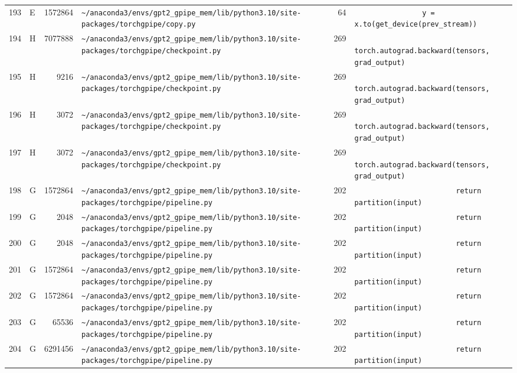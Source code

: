 \documentclass{article}
\begin{document}
\begin{longtable}{r l r p{6.5cm} r p{7.0cm}}
193 & E & 1572864 & \lstinline|~/anaconda3/envs/gpt2_gpipe_mem/lib/python3.10/site-packages/torchgpipe/copy.py| & 64 & \lstinline|                y = x.to(get_device(prev_stream))| \\
194 & H & 7077888 & \lstinline|~/anaconda3/envs/gpt2_gpipe_mem/lib/python3.10/site-packages/torchgpipe/checkpoint.py| & 269 & \lstinline|            torch.autograd.backward(tensors, grad_output)| \\
195 & H & 9216 & \lstinline|~/anaconda3/envs/gpt2_gpipe_mem/lib/python3.10/site-packages/torchgpipe/checkpoint.py| & 269 & \lstinline|            torch.autograd.backward(tensors, grad_output)| \\
196 & H & 3072 & \lstinline|~/anaconda3/envs/gpt2_gpipe_mem/lib/python3.10/site-packages/torchgpipe/checkpoint.py| & 269 & \lstinline|            torch.autograd.backward(tensors, grad_output)| \\
197 & H & 3072 & \lstinline|~/anaconda3/envs/gpt2_gpipe_mem/lib/python3.10/site-packages/torchgpipe/checkpoint.py| & 269 & \lstinline|            torch.autograd.backward(tensors, grad_output)| \\
198 & G & 1572864 & \lstinline|~/anaconda3/envs/gpt2_gpipe_mem/lib/python3.10/site-packages/torchgpipe/pipeline.py| & 202 & \lstinline|                        return partition(input)| \\
199 & G & 2048 & \lstinline|~/anaconda3/envs/gpt2_gpipe_mem/lib/python3.10/site-packages/torchgpipe/pipeline.py| & 202 & \lstinline|                        return partition(input)| \\
200 & G & 2048 & \lstinline|~/anaconda3/envs/gpt2_gpipe_mem/lib/python3.10/site-packages/torchgpipe/pipeline.py| & 202 & \lstinline|                        return partition(input)| \\
201 & G & 1572864 & \lstinline|~/anaconda3/envs/gpt2_gpipe_mem/lib/python3.10/site-packages/torchgpipe/pipeline.py| & 202 & \lstinline|                        return partition(input)| \\
202 & G & 1572864 & \lstinline|~/anaconda3/envs/gpt2_gpipe_mem/lib/python3.10/site-packages/torchgpipe/pipeline.py| & 202 & \lstinline|                        return partition(input)| \\
203 & G & 65536 & \lstinline|~/anaconda3/envs/gpt2_gpipe_mem/lib/python3.10/site-packages/torchgpipe/pipeline.py| & 202 & \lstinline|                        return partition(input)| \\
204 & G & 6291456 & \lstinline|~/anaconda3/envs/gpt2_gpipe_mem/lib/python3.10/site-packages/torchgpipe/pipeline.py| & 202 & \lstinline|                        return partition(input)| \\

\end{longtable}
\end{document}
